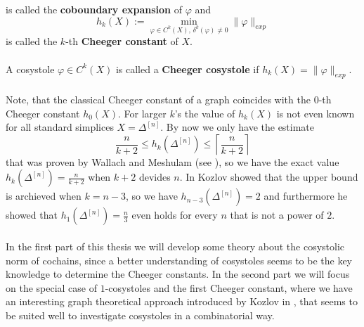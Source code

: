 is called the \textbf{coboundary expansion} of \(\varphi\) and
\[
h_k(X):=\min\limits_{\varphi\in C^k(X)\text{, }\delta^k(\varphi)\neq 0}\|\varphi\|_{exp}
\]
is called the \(k\)-th \textbf{Cheeger constant} of \(X\).\\
\\
A cosystole \(\varphi\in C^k(X)\) is called a \textbf{Cheeger cosystole} if \(h_k(X)=\|\varphi\|_{exp}\).\\
\\
Note, that the classical Cheeger constant of a graph coincides with the \(0\)-th Cheeger constant \(h_0(X)\). For larger \(k\)'s the value of \(h_k(X)\) is not even known for all standard simplices \(X=\Delta^{[n]}\). By now we only have the estimate
\[
\frac{n}{k+2}\leq h_k(\Delta^{[n]})\leq\left\lceil\frac{n}{k+2}\right\rceil
\]
that was proven by Wallach and Meshulam (see \cite{4}), so we have the exact value \(h_k(\Delta^{[n]})=\frac{n}{k+2}\) when \(k+2\) devides \(n\). In \cite{1} Kozlov showed that the upper bound is archieved when \(k=n-3\), so we have \(h_{n-3}(\Delta^{[n]})=2\) and furthermore he showed that \(h_1(\Delta^{[n]})=\frac{n}{3}\) even holds for every \(n\) that is not a power of \(2\).\\
\\
In the first part of this thesis we will develop some theory about the cosystolic norm of cochains, since a better understanding of cosystoles seems to be the key knowledge to determine the Cheeger constants. In the second part we will focus on the special case of \(1\)-cosystoles and the first Cheeger constant, where we have an interesting graph theoretical approach introduced by Kozlov in \cite{1}, that seems to be suited well to investigate cosystoles in a combinatorial way.

